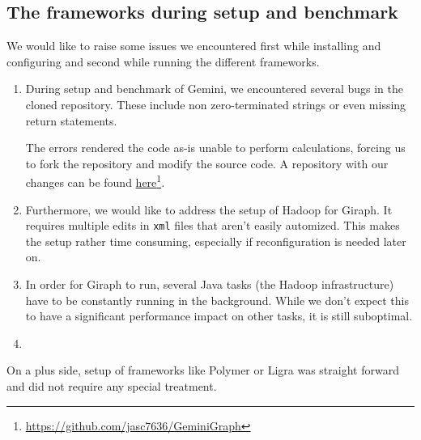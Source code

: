 

\subsection{The frameworks during setup and benchmark}
We would like to raise some issues we encountered first while installing and configuring and second while running the different frameworks.

\begin{enumerate}
	\item During setup and benchmark of Gemini, we encountered several bugs in the cloned repository. These include non zero-terminated strings or even missing return statements.

	The errors rendered the code as-is unable to perform calculations, forcing us to fork the repository and modify the source code. A repository with our changes can be found \href{https://github.com/jasc7636/GeminiGraph}{here}\footnote{\url{https://github.com/jasc7636/GeminiGraph}}.

	\item Furthermore, we would like to address the setup of Hadoop for Giraph. It requires multiple edits in \texttt{xml} files that aren't easily automized. This makes the setup rather time consuming, especially if reconfiguration is needed later on.
	\item In order for Giraph to run, several Java tasks (the Hadoop infrastructure) have to be constantly running in the background. While we don't expect this to have a significant performance impact on other tasks, it is still suboptimal.

	\item 
\end{enumerate}


On a plus side, setup of frameworks like Polymer or Ligra was straight forward and did not require any special treatment. 


